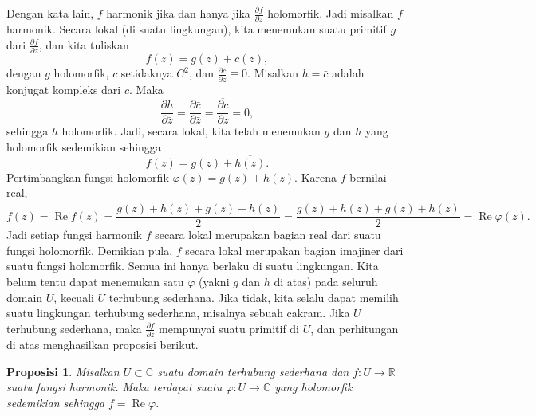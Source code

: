 \documentclass[12pt,openany]{book}
\renewcommand{\Re}{\operatorname{Re}}
\newcommand{\C}{{\mathbb{C}}}
\newcommand{\R}{{\mathbb{R}}}
\theoremstyle{plain}
\newtheorem{prop}[thm]{Proposisi}
\theoremstyle{remark}
\theoremstyle{definition}
\theoremstyle{exercise}
\theoremstyle{example}
\begin{document}
Dengan kata lain, $f$ harmonik jika dan hanya jika
$\frac{\partial f}{\partial z}$ holomorfik.
Jadi misalkan $f$ harmonik.
Secara lokal (di suatu lingkungan), kita menemukan suatu
primitif $g$ dari $\frac{\partial f}{\partial z}$, dan kita tuliskan
\begin{equation*}
f(z) = g(z) + c(z) ,
\end{equation*}
dengan $g$ holomorfik, $c$ setidaknya $C^2$, dan $\frac{\partial c}{\partial z} \equiv 0$.
Misalkan $h = \bar{c}$ adalah konjugat kompleks dari $c$. Maka
\begin{equation*}
\frac{\partial h}{\partial \bar{z}}
=
\frac{\partial \bar{c}}{\partial \bar{z}}
=
\overline{
\frac{\partial c}{\partial z}
}
=
0 ,
\end{equation*}
sehingga $h$ holomorfik. Jadi, secara lokal, kita telah menemukan $g$ dan $h$ yang holomorfik
sedemikian sehingga
\begin{equation*}
f(z) = g(z) + \overline{h(z)} .
\end{equation*}
Pertimbangkan fungsi holomorfik $\varphi(z) = g(z) + h(z)$.
Karena $f$ bernilai real,
\begin{equation*}
f(z) = \Re f(z) =
\frac{g(z) + \overline{h(z)} + \overline{g(z)}+h(z)}{2}
=
\frac{g(z) + h(z) + \overline{g(z)+h(z)}}{2}
=
\Re \varphi(z) .
\end{equation*}
Jadi setiap fungsi harmonik $f$ secara lokal merupakan bagian real dari suatu fungsi
holomorfik. Demikian pula, $f$ secara lokal merupakan bagian imajiner dari suatu fungsi
holomorfik.
Semua ini hanya berlaku di suatu lingkungan. Kita belum tentu dapat menemukan satu
$\varphi$ (yakni $g$ dan $h$ di atas) pada seluruh
domain $U$, kecuali $U$ terhubung sederhana. Jika tidak, kita selalu dapat
memilih suatu lingkungan terhubung sederhana, misalnya sebuah cakram.
Jika $U$ terhubung sederhana, maka
$\frac{\partial f}{\partial z}$ mempunyai suatu primitif di $U$,
dan perhitungan di atas menghasilkan
proposisi berikut.

\begin{prop} \label{prop:harmconj}
Misalkan $U \subset \C$ suatu domain terhubung sederhana dan $f \colon U \to \R$ suatu
fungsi harmonik. Maka terdapat suatu $\varphi \colon
U \to \C$ yang holomorfik sedemikian sehingga $f = \Re \varphi$.
\end{prop}
\end{document}
